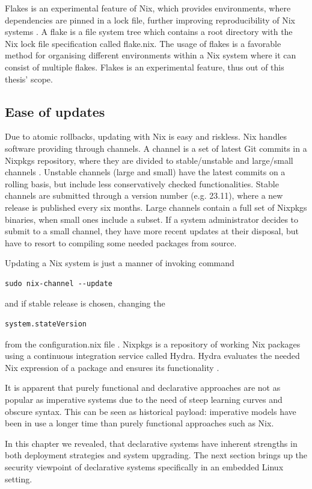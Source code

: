 Flakes is an experimental feature of Nix, which provides environments, where
dependencies are pinned in a lock file, further improving
reproducibility of Nix systems \cite{nixosFlakesNixOS}. A flake is a
file system tree which contains a root directory with the Nix lock file
specification called flake.nix. The usage of flakes is a favorable method
for organising different environments within a Nix system where it
can consist of multiple flakes. Flakes is an experimental
feature, thus out of this thesis' scope. 

\subsection{Ease of updates}

Due to atomic rollbacks, updating with Nix is easy and riskless. Nix
handles software providing through channels. A channel is a set of
latest Git commits in a Nixpkgs repository, where they are divided to
stable/unstable and large/small channels
\cite{nixosChannelsNixOS}. Unstable channels (large and small) have
the latest commits on a rolling basis, but include less conservatively
checked functionalities. Stable channels are submitted through a
version number (e.g. 23.11), where a new release is published every
six months. Large channels contain a full set of Nixpkgs binaries,
when small ones include a subset. If a system administrator decides to
submit to a small channel, they have more recent updates at their
disposal, but have to resort to compiling some needed packages from
source.

Updating a Nix system is just a manner of invoking command

\begin{lstlisting}
sudo nix-channel --update
\end{lstlisting}
and if stable release is chosen, changing the
\begin{lstlisting}
system.stateVersion
\end{lstlisting}
from the configuration.nix file \cite{nixosNixOSManual}. Nixpkgs is a
repository of working Nix packages using a continuous integration
service called Hydra. Hydra evaluates the needed Nix expression of a
package and ensures its functionality \cite{nixosNixOSManual}.

It is apparent that purely functional and declarative approaches are not as popular
as imperative systems due to the need of steep learning curves and
obscure syntax. This can be seen as historical payload: imperative
models have been in use a longer time than purely functional
approaches such as Nix.

In this chapter we revealed, that declarative systems have inherent
strengths in both deployment strategies and system upgrading. The next
section brings up the security viewpoint of declarative systems
specifically in an embedded Linux setting.
